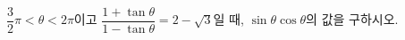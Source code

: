 $\dfrac{3}{2}\pi<\theta<2\pi$이고 $\dfrac{1+\tan\theta}{1-\tan\theta}=2-\sqrt{3}$일 때, $\sin\theta\cos\theta$의 값을 구하시오.
